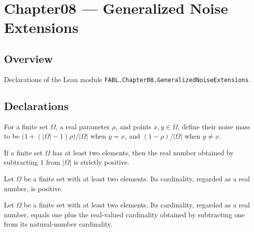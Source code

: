 \chapter{Chapter08 — Generalized Noise Extensions}
\section{Overview}

Declarations of the Lean module \texttt{FABL.Chapter08.GeneralizedNoiseExtensions}.

\section{Declarations}

\begin{definition}
\label{FABL.uniformExtendedNoiseMass}
\leanok
For a finite set $\Omega$, a real parameter $\rho$, and points $x,y\in\Omega$, define
their noise mass to be $\bigl(1+(|\Omega|-1)\rho\bigr)/|\Omega|$ when $y=x$, and
$(1-\rho)/|\Omega|$ when $y\ne x$.
\end{definition}

\begin{theorem}
\label{FABL.card_sub_one_cast_pos}
\leanok
{}
If a finite set $\Omega$ has at least two elements, then the real number obtained by
subtracting $1$ from $|\Omega|$ is strictly positive.
\end{theorem}

\begin{theorem}
\label{FABL.card_cast_pos}
\leanok
{}
Let $\Omega$ be a finite set with at least two elements. Its cardinality, regarded as a
real number, is positive.
\end{theorem}

\begin{theorem}
\label{FABL.card_cast_eq_sub_one_add_one}
\leanok
{}
Let $\Omega$ be a finite set with at least two elements. Its cardinality, regarded as a
real number, equals one plus the real-valued cardinality obtained by subtracting one
from its natural-number cardinality.
\end{theorem}

